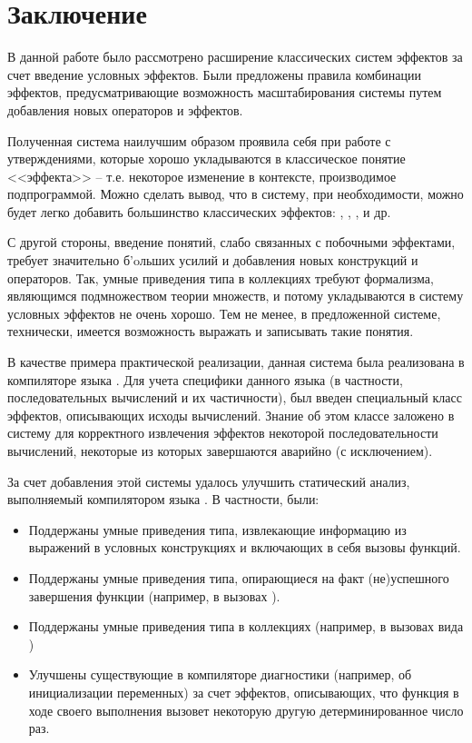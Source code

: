 \section*{Заключение}

В данной работе было рассмотрено расширение классических систем эффектов за счет введение условных эффектов. Были предложены правила комбинации эффектов, предусматривающие возможность масштабирования системы путем добавления новых операторов и эффектов. 

Полученная система наилучшим образом проявила себя при работе с утверждениями, которые хорошо укладываются в классическое понятие <<эффекта>> -- т.е. некоторое изменение в контексте, производимое подпрограммой. Можно сделать вывод, что в систему, при необходимости, можно будет легко добавить большинство классических эффектов: , , , и др. 

С другой стороны, введение понятий, слабо связанных с побочными эффектами, требует значительно б\a'{o}льших усилий и добавления новых конструкций и операторов. Так, умные приведения типа в коллекциях требуют формализма, являющимся подмножеством теории множеств, и потому укладываются в систему условных эффектов не очень хорошо. Тем не менее, в предложенной системе, технически, имеется возможность выражать и записывать такие понятия.

В качестве примера практической реализации, данная система была реализована в компиляторе языка . Для учета специфики данного языка (в частности, последовательных вычислений и их частичности), был введен специальный класс эффектов, описывающих исходы вычислений. Знание об этом классе заложено в систему для корректного извлечения эффектов некоторой последовательности вычислений, некоторые из которых завершаются аварийно (с исключением).

За счет добавления этой системы удалось улучшить статический анализ, выполняемый компилятором языка . В частности, были:

\begin{itemize}
	\item Поддержаны умные приведения типа, извлекающие информацию из выражений в условных конструкциях и включающих в себя вызовы функций.
	
	\item Поддержаны умные приведения типа, опирающиеся на факт (не)успешного завершения функции (например, в вызовах ). 
	
	\item Поддержаны умные приведения типа в коллекциях (например, в вызовах вида )
	
	\item Улучшены существующие в компиляторе диагностики (например, об инициализации переменных) за счет эффектов, описывающих, что функция в ходе своего выполнения вызовет некоторую другую детерминированное число раз. 
\end{itemize}

